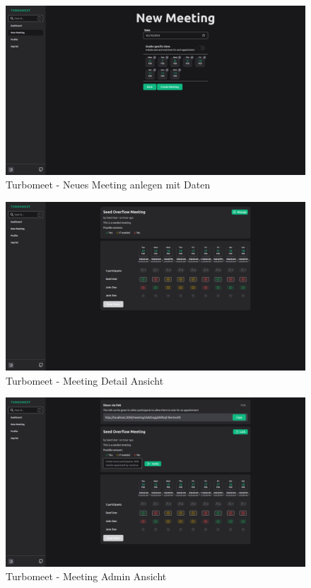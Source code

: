 \begin{figure}[th]
    \centering
    \includegraphics[width=\textwidth]{Figures/turbomeet_desktop_new_meeting_dates.png}
    \decoRule
    \caption{Turbomeet - Neues Meeting anlegen mit Daten}
    \label{fig:turbomeet_desktop_new_meeting_dates}
\end{figure}

\begin{figure}[th]
    \centering
    \includegraphics[width=\textwidth]{Figures/turbomeet_desktop_meeting_detail.png}
    \decoRule
    \caption{Turbomeet - Meeting Detail Ansicht}
    \label{fig:turbomeet_desktop_meeting_detail}
\end{figure}

\begin{figure}[th]
    \centering
    \includegraphics[width=\textwidth]{Figures/turbomeet_desktop_meeting_admin.png}
    \decoRule
    \caption{Turbomeet - Meeting Admin Ansicht}
    \label{fig:turbomeet_desktop_meeting_admin}
\end{figure}

